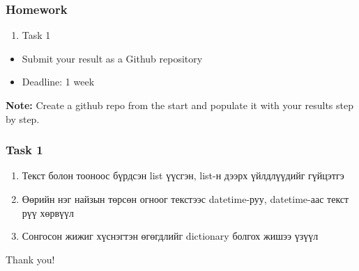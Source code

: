 \documentclass{beamer}
\begin{document}
\begin{frame}
    \frametitle{Homework}
    \begin{enumerate}
        \item Task 1
    \end{enumerate}

    \vskip 2mm
    \begin{itemize}
        \item Submit your result as a Github repository
        \item Deadline: 1 week %
    \end{itemize}

\vfill
\textbf{Note:} Create a github repo from the start and populate it with your results step by step.
\end{frame}

\begin{frame}
    \frametitle{Task 1}
    \begin{enumerate}
        \item Текст болон тооноос бүрдсэн list үүсгэн, list-н дээрх үйлдлүүдийг гүйцэтгэ
        \item Өөрийн нэг найзын төрсөн огноог текстээс datetime-руу, datetime-аас текст рүү хөрвүүл
        \item Сонгосон жижиг хүснэгтэн өгөгдлийг dictionary болгох жишээ үзүүл 
    \end{enumerate}
\end{frame}

\begin{frame}
\Huge{\centerline{Thank you!}}
\end{frame}

\end{document}
